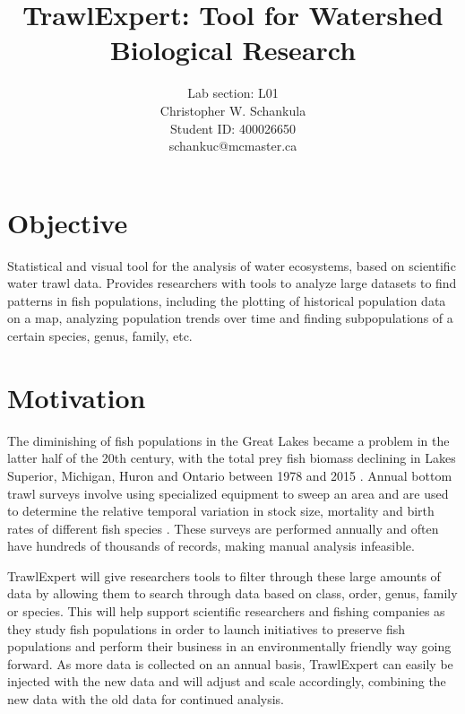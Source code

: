 \documentclass{article}
\begin{document}
\title{TrawlExpert: Tool for Watershed Biological Research}
\author{Lab section: L01 \\ Christopher W. Schankula \\Student ID: 400026650 \\schankuc@mcmaster.ca}

\maketitle

\section{Objective}
Statistical and visual tool for the analysis of water ecosystems, based on scientific water trawl data. Provides researchers with tools to analyze large datasets to find patterns in fish populations, including the plotting of historical population data on a map, analyzing population trends over time and finding subpopulations of a certain species, genus, family, etc.

\section{Motivation}
The diminishing of fish populations in the Great Lakes became a problem in the latter half of the 20th century, with the total prey fish biomass declining in Lakes Superior, Michigan, Huron and Ontario between 1978 and 2015 \citep{michigan2017}. Annual bottom trawl surveys involve using specialized equipment to sweep an area and are used to determine the relative temporal variation in stock size, mortality and birth rates of different fish species \citep{walsh1997efficiency}. These surveys are performed annually and often have hundreds of thousands of records, making manual analysis infeasible.

TrawlExpert will give researchers tools to filter through these large amounts of data by allowing them to search through data based on class, order, genus, family or species. This will help support scientific researchers and fishing companies as they study fish populations in order to launch initiatives to preserve fish populations and perform their business in an environmentally friendly way going forward. As more data is collected on an annual basis, TrawlExpert can easily be injected with the new data and will adjust and scale accordingly, combining the new data with the old data for continued analysis.
\end{document}
